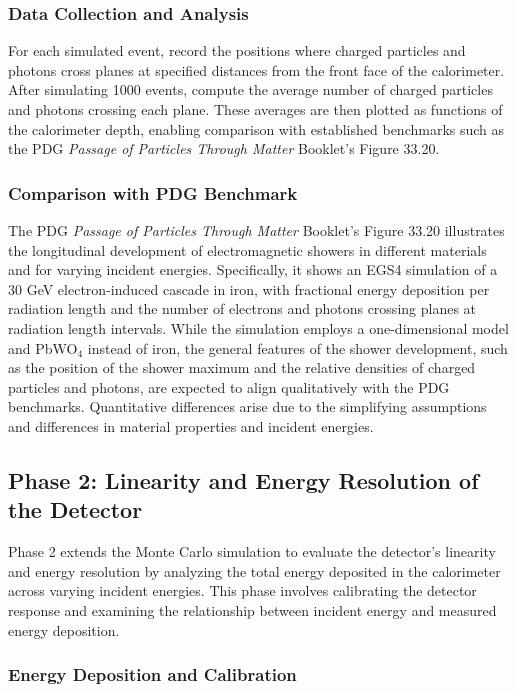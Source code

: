 \documentclass[twocolumn]{aastex631}
\begin{document}
\subsubsection{Data Collection and Analysis}

For each simulated event, record the positions where charged particles and photons cross planes at specified distances from the front face of the calorimeter. After simulating 1000 events, compute the average number of charged particles and photons crossing each plane. These averages are then plotted as functions of the calorimeter depth, enabling comparison with established benchmarks such as the PDG \textit{Passage of Particles Through Matter} Booklet's Figure 33.20.

\subsubsection{Comparison with PDG Benchmark}

The PDG \textit{Passage of Particles Through Matter} Booklet's Figure 33.20 illustrates the longitudinal development of electromagnetic showers in different materials and for varying incident energies. Specifically, it shows an EGS4 simulation of a 30 GeV electron-induced cascade in iron, with fractional energy deposition per radiation length and the number of electrons and photons crossing planes at radiation length intervals. While the simulation employs a one-dimensional model and PbWO\(_4\) instead of iron, the general features of the shower development, such as the position of the shower maximum and the relative densities of charged particles and photons, are expected to align qualitatively with the PDG benchmarks. Quantitative differences arise due to the simplifying assumptions and differences in material properties and incident energies.

\subsection{Phase 2: Linearity and Energy Resolution of the Detector}

Phase 2 extends the Monte Carlo simulation to evaluate the detector's linearity and energy resolution by analyzing the total energy deposited in the calorimeter across varying incident energies. This phase involves calibrating the detector response and examining the relationship between incident energy and measured energy deposition.

\subsubsection{Energy Deposition and Calibration}
\end{document}
